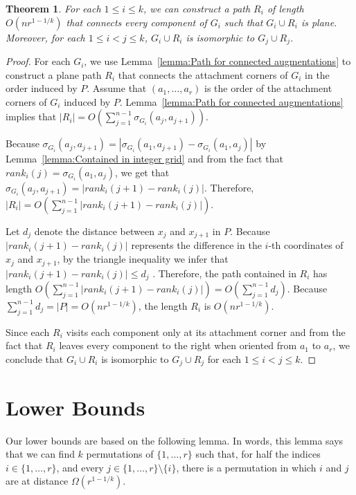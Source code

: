 \documentclass[a4paper, 11pt]{article}
\newtheorem{theorem}{Theorem}[section]
\begin{document}
\begin{theorem}
For each $1\leq i\leq k$, we can construct a path $R_i$ of length $O(nr^{1-1/k})$ that connects every component of $G_i$ such that $G_i\cup R_i$ is plane. Moreover, for each $1\leq i<j\leq k$, $G_i\cup R_i$ is isomorphic to $G_j\cup R_j$.
\end{theorem}
\begin{proof}
For each $G_i$, we use Lemma~\ref{lemma:Path for connected augmentations} to construct a plane path $R_i$ that connects the attachment corners of $G_i$ in the order induced by $P$.
Assume that $(a_1, \ldots, a_r)$ is the order of the attachment corners of $G_i$ induced by $P$.
Lemma~\ref{lemma:Path for connected augmentations} implies that $|R_i| = O(\sum_{j=1}^{n-1} \sigma_{G_i}(a_j, a_{j+1}))$.

Because $\sigma_{G_i}(a_j, a_{j+1}) = |\sigma_{G_i}(a_1, a_{j+1}) - \sigma_{G_i}(a_1, a_j)|$ by Lemma~\ref{lemma:Contained in integer grid} and from the fact that $rank_i(j) = \sigma_{G_i}(a_1, a_j)$, we get that  $\sigma_{G_i}(a_j, a_{j+1}) = |rank_i(j+1) - rank_i(j)|$.
Therefore, $|R_i|  = O\left(\sum_{j=1}^{n-1} |rank_i(j+1) - rank_i(j)|\right)$.

Let $d_j$ denote the distance between $x_j$ and $x_{j+1}$ in $P$. 
Because $|rank_i(j+1) - rank_i(j)|$ represents the difference in the $i$-th coordinates of $x_j$ and $x_{j+1}$, by the triangle inequality we infer that $|rank_i(j+1) - rank_i(j)| \leq  d_j$ . 
Therefore, the path contained in $R_i$ has length $O\left(\sum_{j=1}^{n-1} |rank_i(j+1) - rank_i(j)|\right) = O(\sum_{j=1}^{n-1} d_j)$. 
Because $\sum_{j=1}^{n-1} d_j = |P| = O(nr^{1-1/k})$, the length $R_i$ is $O(nr^{1-1/k})$.

Since each $R_i$ visits each component only at its attachment corner and from the fact that $R_i$ leaves every component to the right when oriented from $a_1$ to $a_r$, we conclude that $G_i\cup R_i$ is isomorphic to $G_j\cup R_j$ for each $1\leq i<j\leq k$.
\end{proof}

\section{Lower Bounds}

Our lower bounds are based on the following lemma. In words, this lemma says that we can find $k$ permutations of $\{1,\ldots,r\}$ such that, for half the indices $i\in\{1,\ldots,r\}$, and every $j\in\{1,\ldots,r\}\setminus\{i\}$, there is a permutation in which $i$ and $j$ are at distance $\Omega(r^{1-1/k})$.
\end{document}
